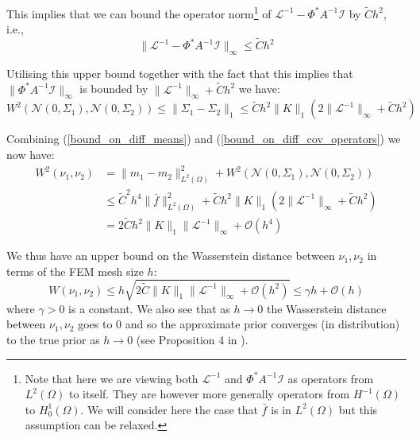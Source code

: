 This implies that we can bound the operator norm\footnote{Note that here we are viewing both $\mathcal{L}^{-1}$ and $\Phi^{*}A^{-1}\mathcal{I}$ as operators from $L^{2}(\Omega)$ to itself. They are however more generally operators from $H^{-1}(\Omega)$ to $H^{1}_{0}(\Omega)$. We will consider here the case that $\bar{f}$ is in $L^{2}(\Omega)$ but this assumption can be relaxed.} of $\mathcal{L}^{-1}-\Phi^{*}A^{-1}\mathcal{I}$ by $\tilde{C}h^{2}$, i.e.,
\begin{equation}
    \label{bound_on_diff_of_solution_operators}
    \|\mathcal{L}^{-1}-\Phi^{*}A^{-1}\mathcal{I}\|_{\infty}\leq \tilde{C}h^{2}
\end{equation}

Utilising this upper bound together with the fact that this implies that $\|\Phi^{*}A^{-1}\mathcal{I}\|_{\infty}$ is bounded by $\|\mathcal{L}^{-1}\|_{\infty}+\tilde{C}h^2$ we have:
\begin{equation}
    \label{bound_on_diff_cov_operators}
    W^{2}(\mathcal{N}(0,\Sigma_1),\mathcal{N}(0,\Sigma_2))\leq\|\Sigma_{1}-\Sigma_{2}\|_{1}\leq \tilde{C}h^{2}\|K\|_{1}\left(2\|\mathcal{L}^{-1}\|_{\infty}+\tilde{C}h^2\right)
\end{equation}

Combining (\ref{bound_on_diff_means}) and (\ref{bound_on_diff_cov_operators}) we now have:
\begin{align*}
    W^{2}(\nu_{1},\nu_{2})&=\|m_1-m_2\|_{L^{2}(\Omega)}^{2}+W^{2}(\mathcal{N}(0,\Sigma_1),\mathcal{N}(0,\Sigma_2)) \\
    &\leq \tilde{C}^{2}h^4\|\bar{f}\|^{2}_{L^{2}(\Omega)}+ \tilde{C}h^{2}\|K\|_{1}\left(2\|\mathcal{L}^{-1}\|_{\infty}+\tilde{C}h^2\right) \\
    &=2\tilde{C}h^{2}\|K\|_{1}\|\mathcal{L}^{-1}\|_{\infty}+\mathcal{O}(h^4)
\end{align*}

We thus have an upper bound on the Wasserstein distance between $\nu_{1},\nu_{2}$ in terms of the FEM mesh size $h$:
\begin{equation}
    \label{bound_on_distance}
    W(\nu_{1},\nu_{2})\leq h \sqrt{2\tilde{C}\|K\|_{1}\|\mathcal{L}^{-1}\|_{\infty}+\mathcal{O}(h^2)}\leq \gamma h +\mathcal{O}(h)
\end{equation}
where $\gamma>0$ is a constant. We also see that as $h\rightarrow 0$ the Wasserstein distance between $\nu_1,\nu_2$ goes to 0 and so the approximate prior converges (in distribution) to the true prior as $h\rightarrow 0$ (see Proposition 4 in \textcolor{blue}{\cite{masarotto2019procrustes}}).



\clearpage
